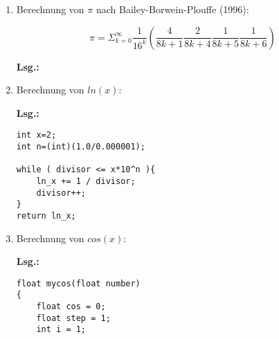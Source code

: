 \documentclass[12pt,a4paper,ngerman]{scrreprt}
\newcommand{\Lsg}{\par \textbf{Lsg.: } \hfill}
\begin{document}
\begin{enumerate}
\begin{enumerate}
\Lsg



\begin{lstlisting}
    #include<math.h>
    void leibnitzpi(double epsilon, double* sum1, int* n){
      double sum2=1.0;
      *sum1=1.0;
      *n=1;
      while( (sum2 / *sum1) >= epsilon ){
        *sum1 = sum2;
        sum2 += pow(-1,*n)/(*n*2 + 1);
        *n++;
      }
    }
\end{lstlisting}
\item Berechnung von $\pi$ nach Bailey-Borwein-Plouffe (1996): 

\[
\pi = \Sigma_{k=0}^{\infty} \frac{1}{16^k} \left( \frac{4}{8k+1} \frac{2}{8k+4} \frac{1}{8k+5} \frac{1}{8k+6} \right)
\]

\Lsg

%
\begin{comment}

\begin{lstlisting}
\end{lstlisting}

\end{comment}


\item Berechnung von $ln(x)$:

\Lsg


\begin{comment}

\end{comment}

\begin{lstlisting}
int x=2;
int n=(int)(1.0/0.000001);

while ( divisor <= x*10^n ){
	ln_x += 1 / divisor;
	divisor++;
}
return ln_x;
\end{lstlisting}

\item Berechnung von $cos(x)$:

\Lsg


\begin{comment}
\end{comment}

\begin{lstlisting}
float mycos(float number)
{
    float cos = 0;
    float step = 1;
    int i = 1;


\end{lstlisting}
\end{enumerate}
\end{enumerate}
\end{document}
